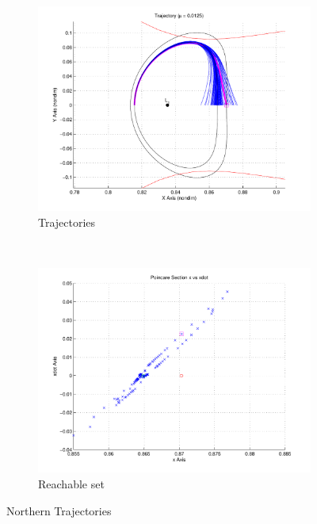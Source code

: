 \begin{figure}[htbp]
    \centering
    \begin{subfigure}[b]{0.49\textwidth}
        \includegraphics[width=\columnwidth]{figures/2015_SSPI/north_reach_trajectory}
        \caption{Trajectories}
        \label{fig:north_trajectory}
    \end{subfigure}
    ~
    \begin{subfigure}[b]{0.49\textwidth}
        \includegraphics[width=\columnwidth]{figures/2015_SSPI/north_reach_poincare}
        \caption{Reachable set }
        \label{fig:north_poincare_reach}
    \end{subfigure}
    \caption{Northern Trajectories}\label{fig:north_reach}
\end{figure}
